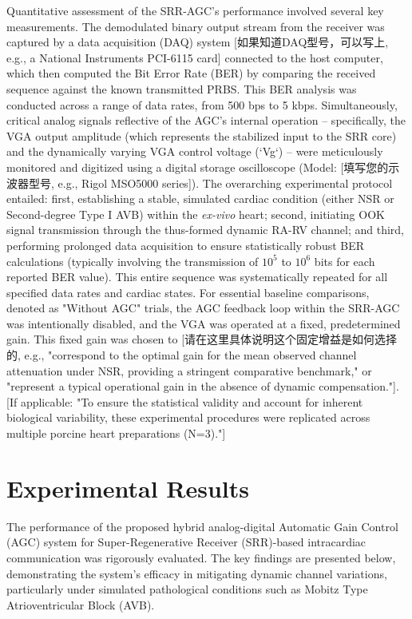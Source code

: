 \documentclass[journal]{IEEEtran}
\begin{document}
Quantitative assessment of the SRR-AGC's performance involved several key measurements. The demodulated binary output stream from the receiver was captured by a data acquisition (DAQ) system [如果知道DAQ型号，可以写上, e.g., a National Instruments PCI-6115 card] connected to the host computer, which then computed the Bit Error Rate (BER) by comparing the received sequence against the known transmitted PRBS. This BER analysis was conducted across a range of data rates, from 500 bps to 5 kbps. Simultaneously, critical analog signals reflective of the AGC's internal operation – specifically, the VGA output amplitude (which represents the stabilized input to the SRR core) and the dynamically varying VGA control voltage (`Vg`) – were meticulously monitored and digitized using a digital storage oscilloscope (Model: [填写您的示波器型号, e.g., Rigol MSO5000 series]). The overarching experimental protocol entailed: first, establishing a stable, simulated cardiac condition (either NSR or Second-degree Type I AVB) within the \textit{ex-vivo} heart; second, initiating OOK signal transmission through the thus-formed dynamic RA-RV channel; and third, performing prolonged data acquisition to ensure statistically robust BER calculations (typically involving the transmission of $10^5$ to $10^6$ bits for each reported BER value). This entire sequence was systematically repeated for all specified data rates and cardiac states. For essential baseline comparisons, denoted as "Without AGC" trials, the AGC feedback loop within the SRR-AGC was intentionally disabled, and the VGA was operated at a fixed, predetermined gain. This fixed gain was chosen to [请在这里具体说明这个固定增益是如何选择的, e.g., "correspond to the optimal gain for the mean observed channel attenuation under NSR, providing a stringent comparative benchmark," or "represent a typical operational gain in the absence of dynamic compensation."]. [If applicable: "To ensure the statistical validity and account for inherent biological variability, these experimental procedures were replicated across multiple porcine heart preparations (N=3)."]






\section{Experimental Results}
\label{sec:results}

The performance of the proposed hybrid analog-digital Automatic Gain Control (AGC) system for Super-Regenerative Receiver (SRR)-based intracardiac communication was rigorously evaluated. The key findings are presented below, demonstrating the system's efficacy in mitigating dynamic channel variations, particularly under simulated pathological conditions such as Mobitz Type Atrioventricular Block (AVB).
\end{document}
